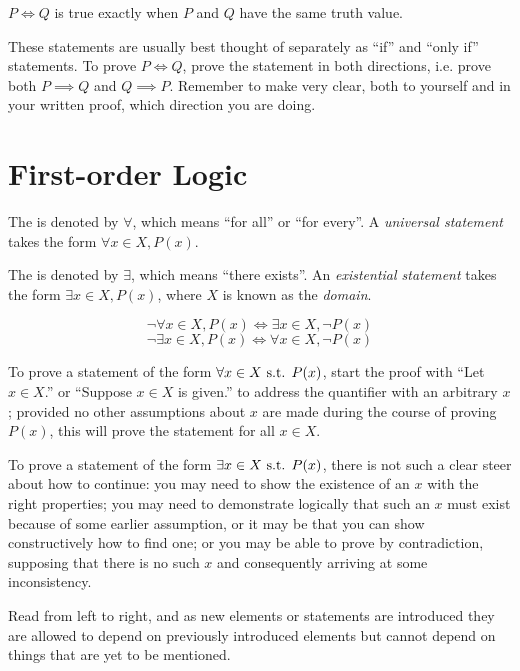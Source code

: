 $P \iff Q$ is true exactly when $P$ and $Q$ have the same truth value.

These statements are usually best thought of separately as ``if'' and ``only if'' statements. To prove $P \iff Q$, prove the statement in both directions, i.e. prove both $P \implies Q$ and $Q \implies P$. Remember to make very clear, both to yourself and in your written proof, which direction you are doing.
\pagebreak

\section{First-order Logic}
The  is denoted by $\forall$, which means ``for all'' or ``for every''. A \emph{universal statement} takes the form $\forall x\in X, P(x)$.

The  is denoted by $\exists$, which means ``there exists''. An \emph{existential statement} takes the form $\exists x\in X, P(x)$, where $X$ is known as the \emph{domain}.

\begin{proposition}
\[ \lnot \forall x\in X,P(x) \iff \exists x\in X,\lnot P(x) \]
\[ \lnot \exists x\in X,P(x) \iff \forall x\in X,\lnot P(x) \]
\end{proposition}

To prove a statement of the form $\forall x \in X \text{ s.t. } P(x)$, start the proof with ``Let $x \in X$.'' or ``Suppose $x \in X$ is given.'' to address the quantifier with an arbitrary $x$; provided no other assumptions about $x$ are made during the course of proving $P(x)$, this will prove the statement for all $x \in X$. 

To prove a statement of the form $\exists x \in X \text{ s.t. } P(x)$, there is not such a clear steer about how to continue: you may need to show the existence of an $x$ with the right properties; you may need to demonstrate logically that such an $x$ must exist because of some earlier assumption, or it may be that you can show constructively how to find one; or you may be able to prove by contradiction, supposing that there is no such $x$ and consequently arriving at some inconsistency.

\begin{remark}
Read from left to right, and as new elements or statements are introduced they are allowed to depend on previously introduced elements but cannot depend on things that are yet to be mentioned.
\end{remark}

